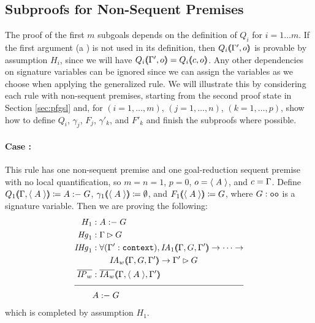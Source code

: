 \subsection{Subproofs for Non-Sequent Premises}
\label{subsec:subpfnonseq}

The proof of the first $m$ subgoals depends on the definition of $Q_i$ for $i = 1 \ldots m$. If the first argument (a ) is not used in its definition, then $Q_i (\hspace{-0.35em} \langle \Gamma'{} , o \rangle \hspace{-0.35em})$ is provable by assumption $H_i$, since we will have $Q_i (\hspace{-0.35em} \langle \Gamma'{} , o \rangle \hspace{-0.35em}) = Q_i (\hspace{-0.35em} \langle c , o \rangle \hspace{-0.35em})$. Any other dependencies on signature variables can be ignored since we can assign the variables as we choose when applying the generalized rule. We will illustrate this by considering each rule with non-sequent premises, starting from the second proof state in Section \ref{sec:pfgsl} and, for $(i = 1 , \ldots , m)$, $(j = 1 , \ldots , n)$, $(k = 1 , \ldots , p)$, show how to define $Q_i$, $\gamma_j$, $F_j$, $\gamma'_k$, and $F'_k$ and finish the subproofs where possible.

\paragraph{Case \rlnmsbc{} :} This rule has one non-sequent premise and one goal-reduction sequent premise with no local quantification, so $m = n = 1$, $p = 0$, $o = \langle \; A \; \rangle$, and $c = \Gamma{}$. Define $Q_1 (\hspace{-0.35em} \langle \Gamma{} , \langle \; A \; \rangle \rangle \hspace{-0.35em}) \coloneqq A \; {:} {-} \; G$, $\gamma_1 (\hspace{-0.35em} \langle \langle \; A \; \rangle \rangle \hspace{-0.35em}) \coloneqq \emptyset$, and $F_1 (\hspace{-0.35em} \langle \langle \; A \; \rangle \rangle \hspace{-0.35em}) \coloneqq G$, where $G : \texttt{oo}$ is a signature variable. Then we are proving
the following:
\begin{align*}
H_1 &: \prog{A}{G} \\
\mathit{Hg}_1 &: \seqsl{G} \\
\mathit{IHg}_1 &: \forall (\inddyncon{} : \sltm{context}), \mathit{IA}_1 \args{\dyncon{} , G , \inddyncon{}} \rightarrow \dots \rightarrow \\
& \qquad \mathit{IA}_w \args{\dyncon{} , G , \inddyncon{}} \rightarrow \seqsl[\inddyncon{}]{G} \\
\ol{\mathit{IP}_w} &: \ol{\mathit{IA}_w} \args{\dyncon{} , \atom{A} , \inddyncon{}} \\[\pfshift{}]
\cline{1-2}
& \prog{A}{G}
\end{align*}
which is completed by assumption $H_1$.

